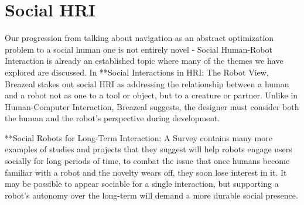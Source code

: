 \documentclass{sfuthesis}
\begin{document}





\section{Social HRI}

Our progression from talking about navigation as an abstract optimization problem to a social human one is not entirely novel - Social Human-Robot Interaction is already an established topic where many of the themes we have explored are discussed. In **Social Interactions in HRI: The Robot View, Breazeal stakes out social HRI as addressing the relationship between a human and a robot not as one to a tool or object, but to a creature or partner. Unlike in Human-Computer Interaction, Breazeal suggests, the designer must consider both the human and the robot's perspective during development. 


**Social Robots for Long-Term Interaction: A Survey contains many more examples of studies and projects that they suggest will help robots engage users socially for long periods of time, to combat the issue that once humans become familiar with a robot and the novelty wears off, they soon lose interest in it. It may be possible to appear sociable for a single interaction, but supporting a robot's autonomy over the long-term will demand a more durable social presence.



\end{document}
